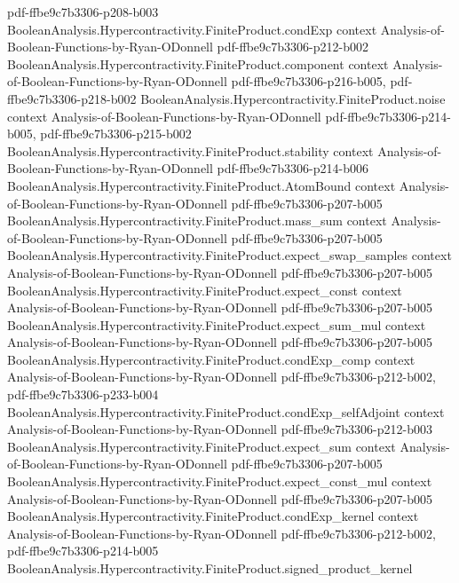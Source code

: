 \begin{theorem}
  {pdf-ffbe9c7b3306-p208-b003}
\proofstep
  {BooleanAnalysis.Hypercontractivity.FiniteProduct.condExp}
  {context}
  {Analysis-of-Boolean-Functions-by-Ryan-ODonnell}
  {pdf-ffbe9c7b3306-p212-b002}
\proofstep
  {BooleanAnalysis.Hypercontractivity.FiniteProduct.component}
  {context}
  {Analysis-of-Boolean-Functions-by-Ryan-ODonnell}
  {pdf-ffbe9c7b3306-p216-b005,
    pdf-ffbe9c7b3306-p218-b002}
\proofstep
  {BooleanAnalysis.Hypercontractivity.FiniteProduct.noise}
  {context}
  {Analysis-of-Boolean-Functions-by-Ryan-ODonnell}
  {pdf-ffbe9c7b3306-p214-b005,
    pdf-ffbe9c7b3306-p215-b002}
\proofstep
  {BooleanAnalysis.Hypercontractivity.FiniteProduct.stability}
  {context}
  {Analysis-of-Boolean-Functions-by-Ryan-ODonnell}
  {pdf-ffbe9c7b3306-p214-b006}
\proofstep
  {BooleanAnalysis.Hypercontractivity.FiniteProduct.AtomBound}
  {context}
  {Analysis-of-Boolean-Functions-by-Ryan-ODonnell}
  {pdf-ffbe9c7b3306-p207-b005}
\proofstep
  {BooleanAnalysis.Hypercontractivity.FiniteProduct.mass_sum}
  {context}
  {Analysis-of-Boolean-Functions-by-Ryan-ODonnell}
  {pdf-ffbe9c7b3306-p207-b005}
\proofstep
  {BooleanAnalysis.Hypercontractivity.FiniteProduct.expect_swap_samples}
  {context}
  {Analysis-of-Boolean-Functions-by-Ryan-ODonnell}
  {pdf-ffbe9c7b3306-p207-b005}
\proofstep
  {BooleanAnalysis.Hypercontractivity.FiniteProduct.expect_const}
  {context}
  {Analysis-of-Boolean-Functions-by-Ryan-ODonnell}
  {pdf-ffbe9c7b3306-p207-b005}
\proofstep
  {BooleanAnalysis.Hypercontractivity.FiniteProduct.expect_sum_mul}
  {context}
  {Analysis-of-Boolean-Functions-by-Ryan-ODonnell}
  {pdf-ffbe9c7b3306-p207-b005}
\proofstep
  {BooleanAnalysis.Hypercontractivity.FiniteProduct.condExp_comp}
  {context}
  {Analysis-of-Boolean-Functions-by-Ryan-ODonnell}
  {pdf-ffbe9c7b3306-p212-b002,
    pdf-ffbe9c7b3306-p233-b004}
\proofstep
  {BooleanAnalysis.Hypercontractivity.FiniteProduct.condExp_selfAdjoint}
  {context}
  {Analysis-of-Boolean-Functions-by-Ryan-ODonnell}
  {pdf-ffbe9c7b3306-p212-b003}
\proofstep
  {BooleanAnalysis.Hypercontractivity.FiniteProduct.expect_sum}
  {context}
  {Analysis-of-Boolean-Functions-by-Ryan-ODonnell}
  {pdf-ffbe9c7b3306-p207-b005}
\proofstep
  {BooleanAnalysis.Hypercontractivity.FiniteProduct.expect_const_mul}
  {context}
  {Analysis-of-Boolean-Functions-by-Ryan-ODonnell}
  {pdf-ffbe9c7b3306-p207-b005}
\proofstep
  {BooleanAnalysis.Hypercontractivity.FiniteProduct.condExp_kernel}
  {context}
  {Analysis-of-Boolean-Functions-by-Ryan-ODonnell}
  {pdf-ffbe9c7b3306-p212-b002,
    pdf-ffbe9c7b3306-p214-b005}
\proofstep
  {BooleanAnalysis.Hypercontractivity.FiniteProduct.signed_product_kernel}

\end{theorem}
